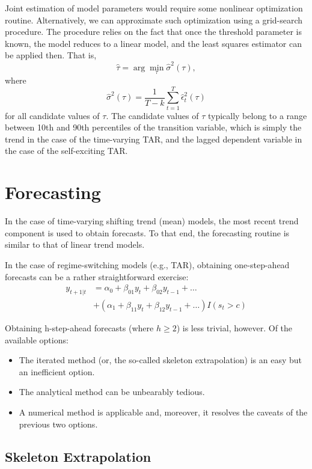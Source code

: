 \documentclass[
  12pt,
  oneside]{book}
\providecommand{\tightlist}{%
  \setlength{\itemsep}{0pt}\setlength{\parskip}{0pt}}
\begin{document}
Joint estimation of model parameters would require some nonlinear optimization routine. Alternatively, we can approximate such optimization using a grid-search procedure. The procedure relies on the fact that once the threshold parameter is known, the model reduces to a linear model, and the least squares estimator can be applied then. That is, \[\hat{\tau} = \arg\min_{\tau}\hat{\sigma}^2(\tau),\] where \[\hat{\sigma}^2(\tau) = \frac{1}{T-k}\sum_{t=1}^{T}\hat{\epsilon}_t^2(\tau)\] for all candidate values of \(\tau\). The candidate values of \(\tau\) typically belong to a range between 10th and 90th percentiles of the transition variable, which is simply the trend in the case of the time-varying TAR, and the lagged dependent variable in the case of the self-exciting TAR.

\hypertarget{forecasting-3}{%
\section{Forecasting}\label{forecasting-3}}

In the case of time-varying shifting trend (mean) models, the most recent trend component is used to obtain forecasts. To that end, the forecasting routine is similar to that of linear trend models.

In the case of regime-switching models (e.g., TAR), obtaining one-step-ahead forecasts can be a rather straightforward exercise:
\[\begin{aligned}
y_{t+1|t} &= \alpha_0+\beta_{01}y_{t}+\beta_{02}y_{t-1}+\ldots \\
          &+ (\alpha_1+\beta_{11}y_{t}+\beta_{12}y_{t-1}+\ldots)I(s_t>c)
\end{aligned}\]

Obtaining h-step-ahead forecasts (where \(h\geq2\)) is less trivial, however. Of the available options:

\begin{itemize}
\tightlist
\item
  The iterated method (or, the so-called skeleton extrapolation) is an easy but an inefficient option.
\item
  The analytical method can be unbearably tedious.
\item
  A numerical method is applicable and, moreover, it resolves the caveats of the previous two options.
\end{itemize}

\hypertarget{skeleton-extrapolation}{%
\subsection{Skeleton Extrapolation}\label{skeleton-extrapolation}}
\end{document}
